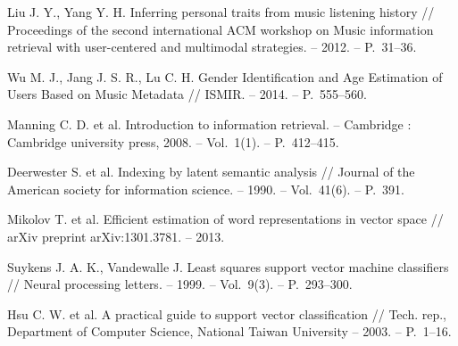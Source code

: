\documentclass{spisok-article}
\begin{document}
\begin{thebibliography}{8}
 Liu J. Y., Yang Y. H. Inferring personal traits
  from music listening history // Proceedings of the second international
  ACM workshop on Music information retrieval with user-centered
  and multimodal strategies. – 2012. – P.~31--36.

 Wu M. J., Jang J. S. R., Lu C. H. Gender Identification
  and Age Estimation of Users Based on Music 
  Metadata // ISMIR. – 2014. – P.~555--560.

 Manning C. D. et al. Introduction to information retrieval. 
    – Cambridge : Cambridge university press, 2008. – Vol.~1(1). – P.~412--415.

 Deerwester S. et al. Indexing by latent semantic analysis
    // Journal of the American society for information 
    science. – 1990. – Vol.~41(6). – P.~391.

 Mikolov T. et al. Efficient estimation of word
    representations in vector space // arXiv preprint arXiv:1301.3781. – 2013.

 Suykens J. A. K., Vandewalle J. Least squares support
    vector machine classifiers // 
    Neural processing letters. – 1999. – Vol.~9(3). – P.~293--300.

 Hsu C. W. et al. A practical
    guide to support vector classification // Tech. rep.,
    Department of Computer Science, National Taiwan University – 2003. – P.~1--16.

\end{thebibliography}
\end{document}
